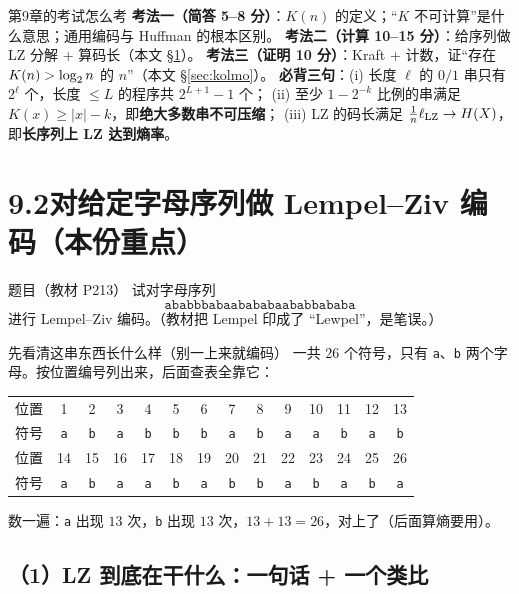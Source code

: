 \documentclass[11pt,a4paper]{ctexart}
\begin{document}
\begin{exam}{第9章的考试怎么考}
\textbf{考法一（简答 5--8 分）}：$K(n)$ 的定义；“$K$ 不可计算”是什么意思；通用编码与 Huffman 的根本区别。
\textbf{考法二（计算 10--15 分）}：给序列做 LZ 分解 + 算码长（本文 \S\ref{sec:lz}）。
\textbf{考法三（证明 10 分）}：Kraft + 计数，证“存在 $K(n)>\log_{2} n$ 的 $n$”（本文 \S\ref{sec:kolmo}）。
\textbf{必背三句}：(i) 长度 $\ell$ 的 $0/1$ 串只有 $2^{\ell}$ 个，长度 $\le L$ 的程序共 $2^{L+1}-1$ 个；
(ii) 至少 $1-2^{-k}$ 比例的串满足 $K(x)\ge|x|-k$，即\textbf{绝大多数串不可压缩}；
(iii) LZ 的码长满足 $\frac1n\ell_{\text{LZ}}\to H\!\left(X\right)$，即\textbf{长序列上 LZ 达到熵率}。
\end{exam}

\section{9.2\quad 对给定字母序列做 Lempel--Ziv 编码（本份重点）}
\label{sec:lz}

\begin{defbox}{题目（教材 P213）}
试对字母序列
\[
\texttt{ababbbabaabababaababbababa}
\]
进行 Lempel--Ziv 编码。（教材把 Lempel 印成了 “Lewpel”，是笔误。）
\end{defbox}

\begin{idea}{先看清这串东西长什么样（别一上来就编码）}
一共 $26$ 个符号，只有 \texttt a、\texttt b 两个字母。按位置编号列出来，后面查表全靠它：
\begin{center}
\small
\setlength{\tabcolsep}{3.2pt}
\begin{tabular}{@{}c|*{13}{c}@{}}
\toprule
位置 & 1&2&3&4&5&6&7&8&9&10&11&12&13\\
符号 & \texttt a&\texttt b&\texttt a&\texttt b&\texttt b&\texttt b&\texttt a&\texttt b&\texttt a&\texttt a&\texttt b&\texttt a&\texttt b\\
\midrule
位置 & 14&15&16&17&18&19&20&21&22&23&24&25&26\\
符号 & \texttt a&\texttt b&\texttt a&\texttt a&\texttt b&\texttt a&\texttt b&\texttt b&\texttt a&\texttt b&\texttt a&\texttt b&\texttt a\\
\bottomrule
\end{tabular}
\end{center}
数一遍：\texttt a 出现 $13$ 次，\texttt b 出现 $13$ 次，$13+13=26$，对上了（后面算熵要用）。
\end{idea}

\subsection{（1）LZ 到底在干什么：一句话 + 一个类比}
\end{document}
